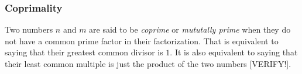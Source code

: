 


%
%



\subsubsection{Coprimality}
Two numbers $n$ and $m$ are said to be \emph{coprime} or \emph{mututally prime} when they do not have a common prime factor in their factorization. That is equivalent to saying that their greatest common divisor is $1$. It is also equivalent to saying that their least common multiple is just the product of the two numbers [VERIFY!].

